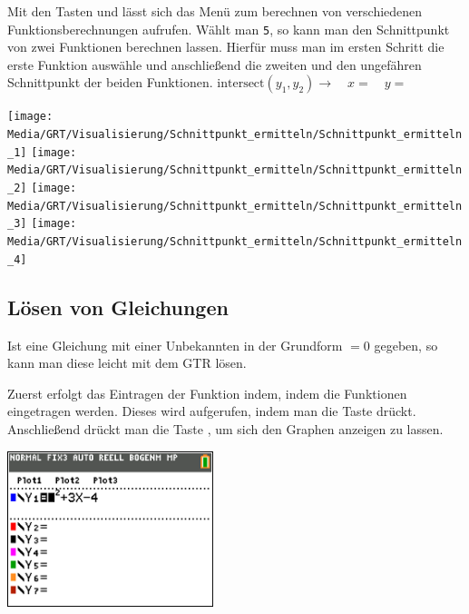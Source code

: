 \begin{paracol}{2}
\begin{flushleft}
	Mit den Tasten  und  lässt sich das Menü zum berechnen von verschiedenen Funktionsberechnungen aufrufen. Wählt man \texttt{5}, so kann man den Schnittpunkt von zwei Funktionen berechnen lassen. Hierfür muss man im ersten Schritt die erste Funktion auswähle und anschließend die zweiten und den ungefähren Schnittpunkt der beiden Funktionen.
	$\textrm{intersect}(y_1,y_2)\rightarrow \quad x=\quad y=$
\end{flushleft}
\switchcolumn
\begin{flushright}
	\texttt{[image: Media/GRT/Visualisierung/Schnittpunkt\_ermitteln/Schnittpunkt\_ermitteln\_1]}
	\texttt{[image: Media/GRT/Visualisierung/Schnittpunkt\_ermitteln/Schnittpunkt\_ermitteln\_2]}
	\texttt{[image: Media/GRT/Visualisierung/Schnittpunkt\_ermitteln/Schnittpunkt\_ermitteln\_3]}
	\texttt{[image: Media/GRT/Visualisierung/Schnittpunkt\_ermitteln/Schnittpunkt\_ermitteln\_4]}
\end{flushright}
\end{paracol}

\subsection{Lösen von Gleichungen}\label{sec:Loesen von Gleichungen}
Ist eine Gleichung mit einer Unbekannten in der Grundform $=0$ gegeben, so kann man diese leicht mit dem GTR lösen.

\begin{paracol}{2}
	\begin{flushleft}
	Zuerst erfolgt das Eintragen der Funktion indem, indem die Funktionen eingetragen werden. Dieses wird aufgerufen, indem man die Taste  drückt.
		Anschließend drückt man die Taste , um sich den Graphen anzeigen zu lassen. 
	\end{flushleft}
\switchcolumn
	\begin{flushright}
	\includegraphics[width= 6cm]{Media/GRT/Visualisierung/loesen_gleichung/loesen_gleichung_1.png}
		\end{flushright}
\end{paracol}


